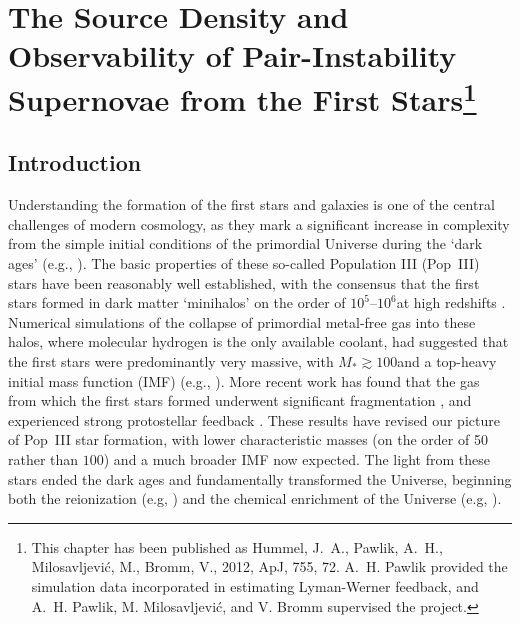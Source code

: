 \documentclass[../thesis.tex]{subfiles}
\begin{document}
\chapter{The Source Density and Observability of Pair-Instability Supernovae from the First Stars\footnote{This chapter has been published as Hummel, J.~A., Pawlik, A.~H., Milosavljevi\'c, M., Bromm, V., 2012, ApJ, 755, 72. A.~H. Pawlik provided the simulation data incorporated in estimating Lyman-Werner feedback, and A.~H. Pawlik, M. Milosavljevi\'c, and V. Bromm supervised the project.}}

\section{Introduction}
Understanding the formation of the first stars and galaxies is one of
the central challenges of modern cosmology, as they mark a significant
increase in complexity from the simple initial conditions of the
primordial Universe during the `dark ages' (e.g.,
\citealt{BarkanaLoeb2001, Miralda-Escude2003, Brommetal2009,
  Loeb2010}). The basic properties of these so-called Population III
(Pop~III) stars have been reasonably well established, with the
consensus that the first stars formed in dark matter `minihalos' on
the order of $10^5$--$10^6$\msun at high redshifts
\citep{CouchmanRees1986,HaimanThoulLoeb1996,Tegmarketal1997}.
Numerical simulations of the collapse of primordial metal-free gas
into these halos, where molecular hydrogen is the only available
coolant, had suggested that the first stars were predominantly very
massive, with $M_* \gtrsim100$\msun and a top-heavy initial mass
function (IMF) (e.g., \citealt{BrommCoppiLarson1999,
  BrommCoppiLarson2002, AbelBryanNorman2002, BrommLarson2004,
  Yoshidaetal2006, OSheaNorman2007}).  More recent work has found
that the gas from which the first stars formed underwent significant
fragmentation \citep{StacyGreifBromm2010, Clarketal2011b,
  Greifetal2011, Greifetal2012}, and experienced strong protostellar
feedback \citep{Hosokawaetal2011, StacyGreifBromm2012}.  These results
have revised our picture of Pop~III star formation, with lower
characteristic masses (on the order of 50 rather than $100$\msun) and
a much broader IMF now expected.  The light from these stars ended the
dark ages and fundamentally transformed the Universe, beginning both
the reionization (e.g, \citealt{Meiksin2009}) and the chemical
enrichment of the Universe (e.g, \citealt{KarlssonBrommHawthorn2013}).
\end{document}
